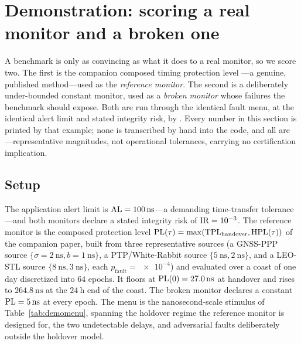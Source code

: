 \section{Demonstration: scoring a real monitor and a broken one}
\label{sec:demo}

A benchmark is only as convincing as what it does to a real monitor, so we score
two. The first is the companion composed timing protection level
\citep{baweja2026cti}---a genuine, published method---used as the \emph{reference
monitor}. The second is a deliberately under-bounded constant monitor, used as a
\emph{broken monitor} whose failures the benchmark should expose. Both are run
through the identical fault menu, at the identical alert limit and stated integrity
risk, by . Every number in this section is printed
by that example; none is transcribed by hand into the code, and all are
\Modelled{}---representative magnitudes, not operational tolerances, carrying no
certification implication.

\subsection{Setup}
\label{sec:demosetup}

The application alert limit is $\mathrm{AL}=\SI{100}{\nano\second}$---a demanding
time-transfer tolerance---and both monitors declare a stated integrity risk of
$\mathrm{IR}=\num{e-3}$. The reference monitor is the composed protection level
$\mathrm{PL}(\tau)=\max(\mathrm{TPL}_{\mathrm{handover}},\mathrm{HPL}(\tau))$ of the companion
paper, built from three representative sources (a GNSS-PPP source
$\{\sigma=\SI{2}{\nano\second},b=\SI{1}{\nano\second}\}$, a PTP/White-Rabbit source
$\{\SI{5}{\nano\second},\SI{2}{\nano\second}\}$, and a LEO-STL source
$\{\SI{8}{\nano\second},\SI{3}{\nano\second}\}$, each $p_{\mathrm{fault}}=\num{e-4}$)
and evaluated over a coast of one day discretized into $64$ epochs. It floors at
$\mathrm{PL}(0)=\SI{27.0}{\nano\second}$ at handover and rises to
$\SI{264.8}{\nano\second}$ at the $\SI{24}{\hour}$ end of the coast. The broken
monitor declares a constant $\mathrm{PL}=\SI{5}{\nano\second}$ at every epoch. The menu is
the nanosecond-scale stimulus of Table~\ref{tab:demomenu}, spanning the holdover
regime the reference monitor is designed for, the two undetectable delays, and
adversarial faults deliberately outside the holdover model.


